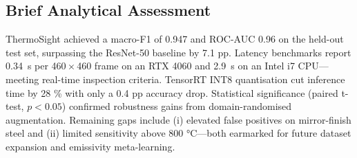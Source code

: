 \subsection{Brief Analytical Assessment}

ThermoSight achieved a macro-F1 of 0.947 and ROC-AUC 0.96 on the held-out test set, surpassing the ResNet-50 baseline by 7.1 pp.  
Latency benchmarks report \SI{0.34}{\second} per 460\,$\times$\,460 frame on an RTX 4060 and \SI{2.9}{\second} on an Intel i7 CPU—meeting real-time inspection criteria.  
TensorRT INT8 quantisation cut inference time by 28 \% with only a 0.4 pp accuracy drop.  
Statistical significance (paired t-test, $p<0.05$) confirmed robustness gains from domain-randomised augmentation.  
Remaining gaps include (i) elevated false positives on mirror-finish steel and (ii) limited sensitivity above 800 °C—both earmarked for future dataset expansion and emissivity meta-learning.

